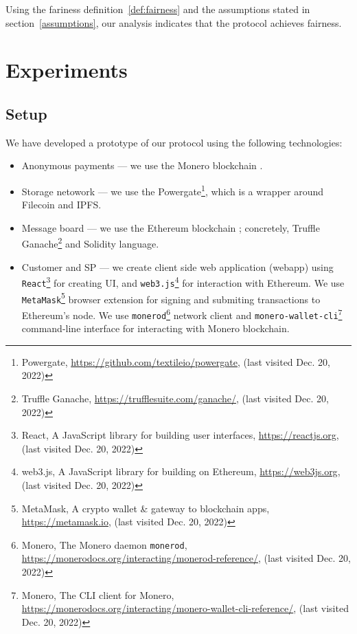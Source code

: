 \documentclass{ieeeaccess}
\begin{document}
Using the fariness definition~\ref{def:fairness} and the assumptions stated in section~\ref{assumptions}, our analysis indicates that the protocol achieves fairness.

\section{Experiments}\label{sec:experiments}

\subsection*{Setup}

We have developed a prototype of our protocol using the following technologies:

\begin{itemize}
  \item{Anonymous payments} — we use the Monero blockchain \cite{noetherRingSignatureConfidential2015}.
  \item{Storage netowork} — we use the Powergate\footnote{Powergate, \url{https://github.com/textileio/powergate}, (last visited Dec. 20, 2022)}, which is a wrapper around Filecoin and IPFS.
  \item{Message board} — we use the Ethereum blockchain \cite{woodEthereumSecureDecentralised2014}; concretely, Truffle Ganache\footnote{Truffle Ganache, \url{https://trufflesuite.com/ganache/}, (last visited Dec. 20, 2022)} and Solidity language.
  \item{Customer and SP} — we create client side web application (webapp) using \texttt{React}\footnote{React, A JavaScript library for building user interfaces, \url{https://reactjs.org}, (last visited Dec. 20, 2022)} for creating UI, and \texttt{web3.js}\footnote{web3.js, A JavaScript library for building on Ethereum, \url{https://web3js.org}, (last visited Dec. 20, 2022)} for interaction with Ethereum. We use \texttt{MetaMask}\footnote{MetaMask, A crypto wallet \& gateway to blockchain apps, \url{https://metamask.io}, (last visited Dec. 20, 2022)} browser extension for signing and submiting transactions to Ethereum's node. We use \texttt{monerod}\footnote{Monero, The Monero daemon \texttt{monerod}, \url{https://monerodocs.org/interacting/monerod-reference/}, (last visited Dec. 20, 2022)} network client and \texttt{monero-wallet-cli}\footnote{Monero, The CLI client for Monero, \url{https://monerodocs.org/interacting/monero-wallet-cli-reference/}, (last visited Dec. 20, 2022)} command-line interface for interacting with Monero blockchain.
\end{itemize}
\end{document}
